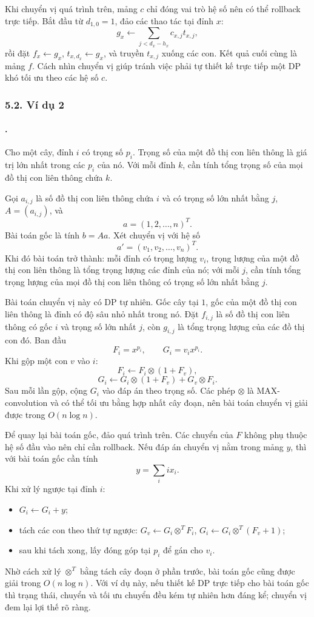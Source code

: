\documentclass[11pt]{article}
\begin{document}
Khi chuyển vị quá trình trên, mảng \(c\) chỉ đóng vai trò hệ số nên có thể
rollback trực tiếp. Bắt đầu từ \(d_{1,0}=1\), đảo các thao tác tại đỉnh \(x\):
\[
  g_x\leftarrow \sum_{j<d_x-h_x} c_{x,j}t_{x,j},
\]
rồi đặt \(f_x\leftarrow g_x\), \(t_{x,d_x}\leftarrow g_x\), và truyền
\(t_{x,j}\) xuống các con. Kết quả cuối cùng là mảng \(f\). Cách nhìn chuyển vị
giúp tránh việc phải tự thiết kế trực tiếp một DP khó tối ưu theo các hệ số
\(c\).

\subsubsection*{5.2. Ví dụ 2}

\paragraph{.}
Cho một cây, đỉnh \(i\) có trọng số \(p_i\). Trọng số của một đồ thị con liên
thông là giá trị lớn nhất trong các \(p_i\) của nó. Với mỗi đỉnh \(k\), cần tính
tổng trọng số của mọi đồ thị con liên thông chứa \(k\).

Gọi \(a_{i,j}\) là số đồ thị con liên thông chứa \(i\) và có trọng số lớn nhất
bằng \(j\), \(A=(a_{i,j})\), và
\[
  a=(1,2,\ldots,n)^T.
\]
Bài toán gốc là tính \(b=Aa\). Xét chuyển vị với hệ số
\[
  a'=(v_1,v_2,\ldots,v_n)^T.
\]
Khi đó bài toán trở thành: mỗi đỉnh có trọng lượng \(v_i\), trọng lượng của một
đồ thị con liên thông là tổng trọng lượng các đỉnh của nó; với mỗi \(j\), cần
tính tổng trọng lượng của mọi đồ thị con liên thông có trọng số lớn nhất bằng
\(j\).

Bài toán chuyển vị này có DP tự nhiên. Gốc cây tại \(1\), gốc của một đồ thị
con liên thông là đỉnh có độ sâu nhỏ nhất trong nó. Đặt \(f_{i,j}\) là số đồ
thị con liên thông có gốc \(i\) và trọng số lớn nhất \(j\), còn \(g_{i,j}\) là
tổng trọng lượng của các đồ thị con đó. Ban đầu
\[
  F_i=x^{p_i},\qquad G_i=v_i x^{p_i}.
\]
Khi gộp một con \(v\) vào \(i\):
\[
  F_i\leftarrow F_i\otimes(1+F_v),
\]
\[
  G_i\leftarrow G_i\otimes(1+F_v)+G_v\otimes F_i.
\]
Sau mỗi lần gộp, cộng \(G_i\) vào đáp án theo trọng số. Các phép \(\otimes\) là
MAX-convolution và có thể tối ưu bằng hợp nhất cây đoạn, nên bài toán chuyển vị
giải được trong \(O(n\log n)\).

Để quay lại bài toán gốc, đảo quá trình trên. Các chuyển của \(F\) không phụ
thuộc hệ số đầu vào nên chỉ cần rollback. Nếu đáp án chuyển vị nằm trong mảng
\(y\), thì với bài toán gốc cần tính
\[
  y=\sum_i i x_i.
\]
Khi xử lý ngược tại đỉnh \(i\):
\begin{itemize}
  \item \(G_i\leftarrow G_i+y\);
  \item tách các con theo thứ tự ngược:
  \(G_v\leftarrow G_i\otimes^T F_i\),
  \(G_i\leftarrow G_i\otimes^T(F_v+1)\);
  \item sau khi tách xong, lấy đóng góp tại \(p_i\) để gán cho \(v_i\).
\end{itemize}
Nhờ cách xử lý \(\otimes^T\) bằng tách cây đoạn ở phần trước, bài toán gốc cũng
được giải trong \(O(n\log n)\). Với ví dụ này, nếu thiết kế DP trực tiếp cho
bài toán gốc thì trạng thái, chuyển và tối ưu chuyển đều kém tự nhiên hơn đáng
kể; chuyển vị đem lại lợi thế rõ ràng.
\end{document}
